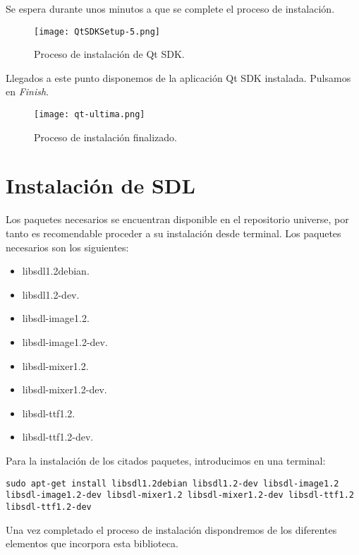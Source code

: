 Se espera durante unos minutos a que se complete el proceso de instalación. \\

\begin{figure}[H]
  \begin{center}
    \texttt{[image: QtSDKSetup-5.png]}
  \end{center}
  \caption{Proceso de instalación de Qt SDK.}
  \label{opencv-ok}
\end{figure}


Llegados a este punto disponemos de la aplicación Qt SDK instalada. Pulsamos en \emph{Finish}.\\

\begin{figure}[H]
  \begin{center}
    \texttt{[image: qt-ultima.png]}
  \end{center}
  \caption{Proceso de instalación finalizado.}
  \label{opencv-ok}
\end{figure}

\section{Instalación de SDL}

Los paquetes necesarios se encuentran disponible en el repositorio universe, por tanto es recomendable proceder a su instalación desde terminal. Los paquetes necesarios son los siguientes:

\begin{itemize}
\item libsdl1.2debian.
\item libsdl1.2-dev.
\item libsdl-image1.2.
\item libsdl-image1.2-dev.
\item libsdl-mixer1.2.
\item libsdl-mixer1.2-dev.
\item libsdl-ttf1.2.
\item libsdl-ttf1.2-dev.
\end{itemize}

Para la instalación de los citados paquetes, introducimos en una terminal:\\

\begin{lstlisting}[style=consola]
sudo apt-get install libsdl1.2debian libsdl1.2-dev libsdl-image1.2 libsdl-image1.2-dev libsdl-mixer1.2 libsdl-mixer1.2-dev libsdl-ttf1.2 libsdl-ttf1.2-dev
\end{lstlisting}

Una vez completado el proceso de instalación dispondremos de los diferentes elementos que incorpora esta biblioteca.\\
